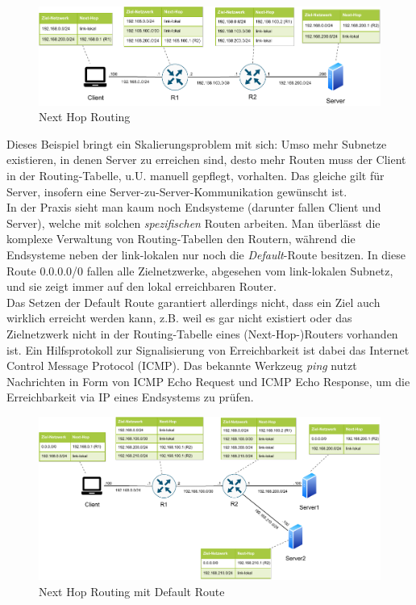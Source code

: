 \begin{figure}[h]
  \centering
  \includegraphics{Figures/next_hop_routing_specific_table.pdf}
  \caption{Next Hop Routing}
  \label{grafik: next_hop_routing}
\end{figure}

Dieses Beispiel bringt ein Skalierungsproblem mit sich: Umso mehr Subnetze existieren, in denen Server zu erreichen sind, desto mehr Routen muss der Client in der Routing-Tabelle, u.U. manuell gepflegt, vorhalten. Das gleiche gilt für Server, insofern eine Server-zu-Server-Kommunikation gewünscht ist.\\
In der Praxis sieht man kaum noch Endsysteme (darunter fallen Client und Server), welche mit solchen \textit{spezifischen} Routen arbeiten. Man überlässt die komplexe Verwaltung von Routing-Tabellen den Routern, während die Endsysteme neben der link-lokalen nur noch die \textit{Default}-Route besitzen. In diese Route 0.0.0.0/0 fallen alle Zielnetzwerke, abgesehen vom link-lokalen Subnetz, und sie zeigt immer auf den lokal erreichbaren Router.\\
Das Setzen der Default Route garantiert allerdings nicht, dass ein Ziel auch wirklich erreicht werden kann, z.B. weil es gar nicht existiert oder das Zielnetzwerk nicht in der Routing-Tabelle eines (Next-Hop-)Routers vorhanden ist. Ein Hilfsprotokoll zur Signalisierung von Erreichbarkeit ist dabei das Internet Control Message Protocol (ICMP). Das bekannte Werkzeug \textit{ping} nutzt Nachrichten in Form von ICMP Echo Request und ICMP Echo Response, um die Erreichbarkeit via IP eines Endsystems zu prüfen.
\begin{figure}[h]
  \centering
  \includegraphics[scale=0.95]{Figures/next_hop_routing_default_route.pdf}
  \caption{Next Hop Routing mit Default Route}
  \label{grafik: next_hop_routing_with_default_route}
\end{figure}\FloatBarrier

